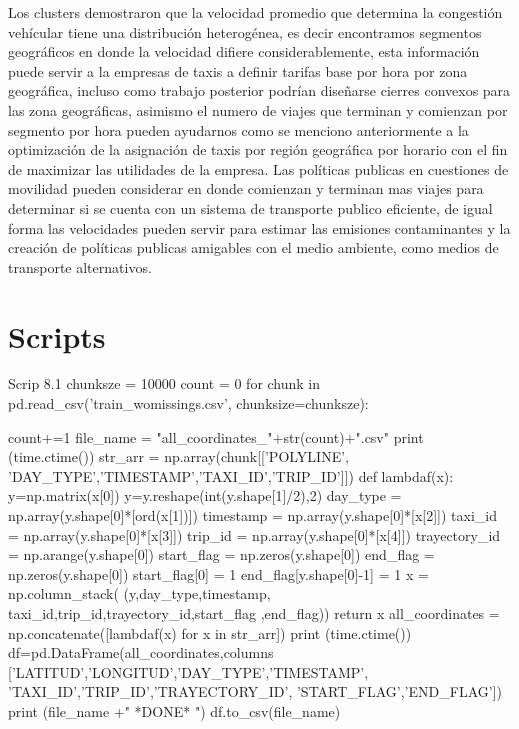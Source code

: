 \documentclass[a4paper]{article}
\begin{document}
Los clusters demostraron que la velocidad promedio que determina la congestión vehícular tiene una distribución heterogénea, es decir encontramos segmentos geográficos en donde la velocidad difiere considerablemente, esta información puede servir a la empresas de taxis a definir tarifas base por hora por zona geográfica, incluso  como trabajo posterior podrían diseñarse cierres convexos para las zona geográficas, asimismo el numero de viajes que terminan y comienzan por segmento por hora pueden ayudarnos como se menciono anteriormente a la optimización de la asignación de taxis por región geográfica por horario con el fin de maximizar las utilidades de la empresa.
Las políticas publicas en cuestiones de movilidad pueden considerar en donde comienzan y terminan mas viajes para determinar si se cuenta con un sistema de transporte publico eficiente, de igual forma las velocidades pueden servir para estimar las emisiones contaminantes y la creación de políticas publicas amigables con el medio ambiente, como medios de transporte alternativos.


\section{Scripts}
\begin{sexylisting}{Scrip 8.1}
chunksze   = 10000
count = 0
for chunk in 
pd.read_csv('train_womissings.csv', chunksize=chunksze):

count+=1
        file_name = "all_coordinates_"+str(count)+".csv"
        print (time.ctime())
        str_arr = np.array(chunk[['POLYLINE',
        'DAY_TYPE','TIMESTAMP','TAXI_ID','TRIP_ID']])
        def lambdaf(x):
            y=np.matrix(x[0])
            y=y.reshape(int(y.shape[1]/2),2)
            day_type = np.array(y.shape[0]*[ord(x[1])])
            timestamp = np.array(y.shape[0]*[x[2]])
            taxi_id = np.array(y.shape[0]*[x[3]])
            trip_id = np.array(y.shape[0]*[x[4]])
            trayectory_id = np.arange(y.shape[0])
            start_flag = np.zeros(y.shape[0])
            end_flag = np.zeros(y.shape[0])
            start_flag[0] = 1
            end_flag[y.shape[0]-1] = 1
            x = np.column_stack(
            (y,day_type,timestamp,
            taxi_id,trip_id,trayectory_id,start_flag 			  					,end_flag))
            return x
        all_coordinates = 
        np.concatenate([lambdaf(x) for x in str_arr])
        print (time.ctime())
        df=pd.DataFrame(all_coordinates,columns
        ['LATITUD','LONGITUD','DAY_TYPE','TIMESTAMP',                              'TAXI_ID','TRIP_ID','TRAYECTORY_ID',
        'START_FLAG','END_FLAG'])
        print (file_name +" *DONE* ")
        df.to_csv(file_name)

\end{sexylisting}
\end{document}
